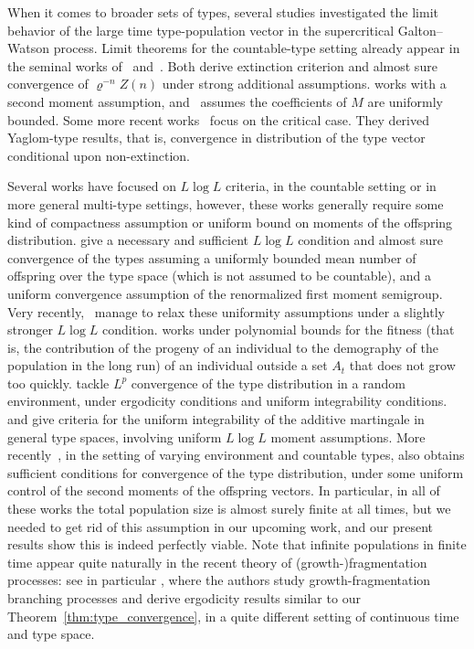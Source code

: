 \begin{refsegment}
When it comes to broader sets of types, several studies investigated the limit behavior of the large time type-population vector in the supercritical Galton--Watson process.
Limit theorems for the countable-type setting already appear in the seminal works of~\citet[Chapter~III]{harris_theory_1964} and~\citet{moy_extensions_1967}.
Both derive extinction criterion and almost sure convergence of $\varrho^{-n}Z(n)$ under strong additional assumptions.
\citet{moy_extensions_1967} works with a second moment assumption, and~\citet[Chapter~III]{harris_theory_1964} assumes the coefficients of $M$ are uniformly bounded.
Some more recent
works~\citep{loic_de_raphelis_scaling_2017,topchii_critical_2020}
focus on the critical case. They derived Yaglom-type results, that is,
convergence in distribution of the type vector conditional upon
non-extinction.

Several works have focused on $L\log L$ criteria, in the countable
setting or in more general multi-type settings, however, these works
generally require some kind of compactness assumption or uniform bound
on moments of the offspring distribution. \citet{asmussen_strong_1976}
give a necessary and sufficient $L\log L$ condition and almost sure
convergence of the types assuming a uniformly bounded mean number of
offspring over the type space (which is not assumed to be
countable), and a uniform convergence assumption of the
renormalized first moment semigroup. Very recently,~\citet{BBC25}
manage to relax these uniformity assumptions under a slightly stronger
$L \log L$ condition. \citet{kesten_supercritical_1989} works under
polynomial bounds for the fitness (that is, the contribution of the
progeny of an individual to the demography of the population in the
long run) of an individual outside a set $A_t$ that does not grow too
quickly. \citet{biggins_multi-type_1999} tackle $L^p$ convergence of
the type distribution in a random environment, under ergodicity
conditions and uniform integrability conditions.
\citet{athreya_change_2000} and \citet{kyprianou_measure_2004} give
criteria for the uniform integrability of the additive martingale in
general type spaces, involving uniform $L \log L$ moment assumptions.
More recently~\cite{ligonniere_kesten_2024}, in the setting of varying
environment and countable types, also obtains sufficient conditions
for convergence of the type distribution, under some uniform control
of the second moments of the offspring vectors. In particular, in all
of these works the total population size is almost surely finite at
all times, but we needed to get rid of this assumption in our upcoming
work, and our present results show this is indeed perfectly viable.
Note that infinite populations in finite time appear quite naturally
in the recent theory of (growth-)fragmentation processes: see in
particular \citet[Theorem~1.1]{bertoin_strong_2020}, where the authors
study growth-fragmentation branching processes and derive ergodicity
results similar to our Theorem~\ref{thm:type_convergence}, in a quite
different setting of continuous time and type space.


\end{refsegment}

